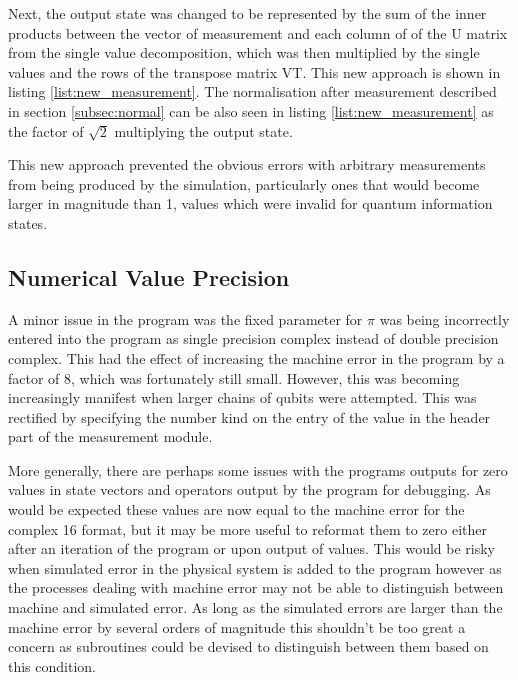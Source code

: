 Next, the output state was changed to be represented by the sum of the inner products between the vector of measurement and each column of of the U matrix from the single value decomposition, which was then multiplied by the single values and the rows of the transpose matrix VT. This new approach is shown in listing \ref{list:new_measurement}. The normalisation after measurement described in section \ref{subsec:normal} can be also seen in listing \ref{list:new_measurement} as the factor of $\sqrt{2}$ multiplying the output state. 



This new approach prevented the obvious errors with arbitrary measurements from being produced by the simulation, particularly ones that would become larger in magnitude than 1, values which were invalid for quantum information states. 


\subsection{Numerical Value Precision}

A minor issue in the program was the fixed parameter for $\pi$ was being incorrectly entered into the program as single precision complex instead of double precision complex. This had the effect of increasing the machine error in the program by a factor of 8, which was fortunately still small. However, this was becoming increasingly manifest when larger chains of qubits were attempted. This was rectified by specifying the number kind on the entry of the value in the header part of the measurement module.

More generally, there are perhaps some issues with the programs outputs for zero values in state vectors and operators output by the program for debugging. As would be expected these values are now equal to the machine error for the complex 16 format, but it may be more useful to reformat them to zero either after an iteration of the program or upon output of values. This would be risky when simulated error in the physical system is added to the program however as the processes dealing with machine error may not be able to distinguish between machine and simulated error. As long as the simulated errors are larger than the machine error by several orders of magnitude this shouldn't be too great a concern as subroutines could be devised to distinguish between them based on this condition.


